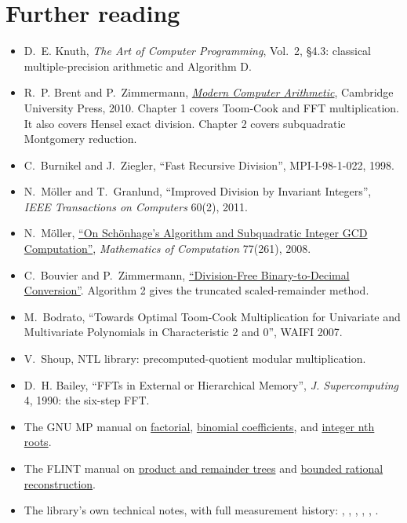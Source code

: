 \section{Further reading}

\begin{itemize}
  \item D.~E. Knuth, \emph{The Art of Computer Programming}, Vol.~2, §4.3: classical multiple-precision
        arithmetic and Algorithm D.
  \item R.~P. Brent and P.~Zimmermann,
        \href{https://members.loria.fr/PZimmermann/mca/pub226.html}{\emph{Modern Computer Arithmetic}},
        Cambridge University Press, 2010. Chapter 1 covers Toom-Cook and FFT multiplication.
        It also covers Hensel exact division. Chapter 2 covers subquadratic Montgomery reduction.
  \item C.~Burnikel and J.~Ziegler, ``Fast Recursive Division'', MPI-I-98-1-022, 1998.
  \item N.~Möller and T.~Granlund, ``Improved Division by Invariant Integers'', \emph{IEEE Transactions on
        Computers} 60(2), 2011.
  \item N.~Möller, \href{https://doi.org/10.1090/S0025-5718-07-02017-0}{``On Sch\"onhage's Algorithm
        and Subquadratic Integer GCD Computation''}, \emph{Mathematics of Computation} 77(261), 2008.
  \item C.~Bouvier and P.~Zimmermann,
        \href{https://members.loria.fr/PZimmermann/papers/get_str.pdf}{``Division-Free Binary-to-Decimal Conversion''}.
        Algorithm 2 gives the truncated scaled-remainder method.
  \item M.~Bodrato, ``Towards Optimal Toom-Cook Multiplication for Univariate and Multivariate
        Polynomials in Characteristic 2 and 0'', WAIFI 2007.
  \item V.~Shoup, NTL library: precomputed-quotient modular multiplication.
  \item D.~H. Bailey, ``FFTs in External or Hierarchical Memory'', \emph{J. Supercomputing} 4, 1990:
        the six-step FFT.
  \item The GNU MP manual on \href{https://gmplib.org/manual/Factorial-Algorithm}{factorial},
        \href{https://gmplib.org/manual/Binomial-Coefficients-Algorithm}{binomial coefficients},
        and \href{https://gmplib.org/manual/Nth-Root-Algorithm}{integer nth roots}.
  \item The FLINT manual on
        \href{https://flintlib.org/doc/algorithms/integers/multimodular-reduction.html}{product and remainder trees}
        and \href{https://flintlib.org/doc/fmpq/reconstruct.html}{bounded rational reconstruction}.
  \item {\raggedright The library's own technical notes, with full measurement history:
        , , ,
        , , .\par}
\end{itemize}
